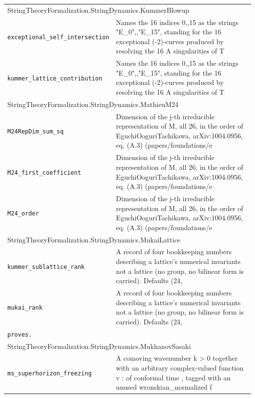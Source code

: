 \begin{longtable}{p{}p{}}
\multicolumn{2}{l}{\textsf{\small StringTheoryFormalization.StringDynamics.KummerBlowup}} \\
\quad\texttt{\footnotesize exceptional\_self\_intersection} & {\footnotesize Names the 16 indices 0,,15 as the strings "E\_0",,"E\_15", standing for the 16 exceptional (-2)-curves produced by resolving the 16 A singularities of T} \\
\quad\texttt{\footnotesize kummer\_lattice\_contribution} & {\footnotesize Names the 16 indices 0,,15 as the strings "E\_0",,"E\_15", standing for the 16 exceptional (-2)-curves produced by resolving the 16 A singularities of T} \\
\multicolumn{2}{l}{\textsf{\small StringTheoryFormalization.StringDynamics.MathieuM24}} \\
\quad\texttt{\footnotesize M24RepDim\_sum\_sq} & {\footnotesize Dimension of the j-th irreducible representation of M, all 26, in the order of EguchiOoguriTachikawa, arXiv:1004.0956, eq. (A.3) (papers/foundations/e} \\
\quad\texttt{\footnotesize M24\_first\_coefficient} & {\footnotesize Dimension of the j-th irreducible representation of M, all 26, in the order of EguchiOoguriTachikawa, arXiv:1004.0956, eq. (A.3) (papers/foundations/e} \\
\quad\texttt{\footnotesize M24\_order} & {\footnotesize Dimension of the j-th irreducible representation of M, all 26, in the order of EguchiOoguriTachikawa, arXiv:1004.0956, eq. (A.3) (papers/foundations/e} \\
\multicolumn{2}{l}{\textsf{\small StringTheoryFormalization.StringDynamics.MukaiLattice}} \\
\quad\texttt{\footnotesize kummer\_sublattice\_rank} & {\footnotesize A record of four bookkeeping numbers describing a lattice's numerical invariants  not a lattice (no group, no bilinear form is carried). Defaults (24,} \\
\quad\texttt{\footnotesize mukai\_rank} & {\footnotesize A record of four bookkeeping numbers describing a lattice's numerical invariants  not a lattice (no group, no bilinear form is carried). Defaults (24,} \\
\quad\texttt{\footnotesize proves.} & {\footnotesize } \\
\multicolumn{2}{l}{\textsf{\small StringTheoryFormalization.StringDynamics.MukhanovSasaki}} \\
\quad\texttt{\footnotesize ms\_superhorizon\_freezing} & {\footnotesize A comoving wavenumber k > 0 together with an arbitrary complex-valued function v :    of conformal time , tagged with an unused wronskian\_normalized f} \\

\end{longtable}
